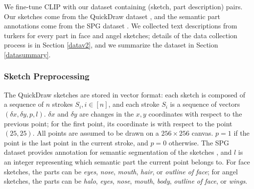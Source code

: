 

We fine-tune CLIP with our dataset containing (sketch, part description) pairs. Our sketches come from the QuickDraw dataset \citep{ha2017neural}, and the semantic part annotations come from the SPG dataset \citep{spg_paper}. We collected text descriptions from turkers for every part in face and angel sketches; details of the data collection process is in Section \ref{datav2}, and we summarize the dataset in Section \ref{datasummary}.  

\subsubsection*{Sketch Preprocessing} \label{sketch.preprocess}
The QuickDraw sketches are stored in vector format: each sketch is composed of a sequence of $n$ strokes $S_i, i \in [n]$, and each stroke $S_i$ is a sequence of vectors $(\delta x,\delta y, p, l)$. 
$\delta x$ and $\delta y$ are changes in the $x,y$ coordinates with respect to the previous point; for the first point, its coordinate is with respect to the point $(25,25)$. 
All points are assumed to be drawn on a $256 \times 256$ canvas. 
$p=1$ if the point is the last point in the current stroke, and $p=0$ otherwise. 
The SPG dataset provides annotation for semantic segmentation of the sketches \citep{spg_paper}, and $l$ is an integer representing which semantic part the current point belongs to. For face sketches, the parts can be \textit{eyes}, \textit{nose}, \textit{mouth}, \textit{hair}, or \textit{outline of face}; for angel sketches, the parts can be \textit{halo}, \textit{eyes}, \textit{nose}, \textit{mouth}, \textit{body}, \textit{outline of face}, or \textit{wings}.

